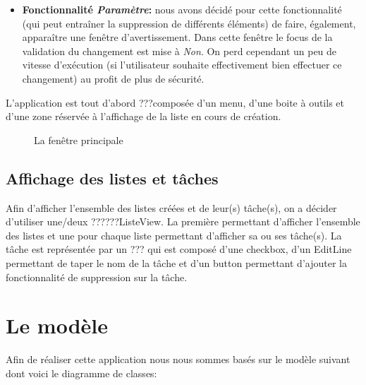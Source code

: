 \documentclass[a4paper,10pt]{article}
\begin{document}
\begin{itemize}
\item \textbf{Fonctionnalité \textit{Paramètre}:} nous avons décidé pour cette fonctionnalité (qui peut entraîner la suppression de différents éléments) de faire, également, apparaître une fenêtre d'avertissement. Dans cette fenêtre le focus de la validation du changement est mise à \textit{Non}. On perd
cependant un peu de vitesse d'exécution (si l'utilisateur souhaite effectivement bien effectuer ce changement) au profit de plus de sécurité.
\end{itemize}

L'application est tout d'abord ???composée d'un menu, d'une boite à outils et d'une zone réservée à l'affichage de la liste en cours de création.
\begin{figure}[H]
    \center
    \caption{La fenêtre principale}
\end{figure}



\subsection{Affichage des listes et tâches}
Afin d'afficher l'ensemble des listes créées et de leur(s) tâche(s), on a décider d'utiliser une/deux ??????ListeView. La première permettant d'afficher l'ensemble des listes et une pour chaque liste permettant d'afficher sa ou ses tâche(s). 
La tâche est représentée par un ??? qui est composé d'une checkbox, d'un EditLine permettant de taper le nom de la tâche et d'un button permettant d'ajouter la fonctionnalité de suppression sur la tâche.

\newpage
\section{Le modèle}
Afin de réaliser cette application nous nous sommes basés sur le modèle suivant dont voici le diagramme de classes:
\end{document}
